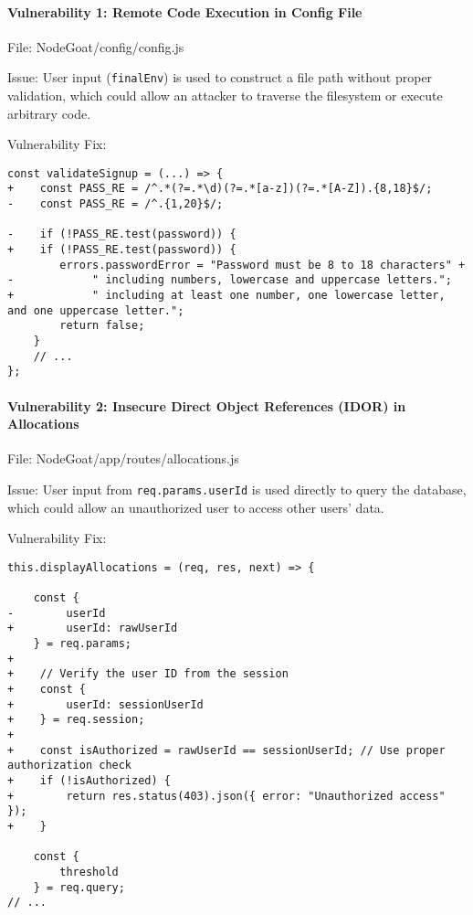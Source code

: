   \hypertarget{vulnerability-1-remote-code-execution-in-config-file}{%
  \paragraph{Vulnerability 1: Remote Code Execution in Config
  File}\label{vulnerability-1-remote-code-execution-in-config-file}}
  
  File: NodeGoat/config/config.js
  
  Issue: User input (\texttt{finalEnv}) is used to construct a file path
  without proper validation, which could allow an attacker to traverse the
  filesystem or execute arbitrary code.
  
  Vulnerability Fix:
  
  \begin{framed}\scriptsize
    \begin{verbatim}
const validateSignup = (...) => {
+    const PASS_RE = /^.*(?=.*\d)(?=.*[a-z])(?=.*[A-Z]).{8,18}$/;
-    const PASS_RE = /^.{1,20}$/;

-    if (!PASS_RE.test(password)) {
+    if (!PASS_RE.test(password)) {
        errors.passwordError = "Password must be 8 to 18 characters" +
-            " including numbers, lowercase and uppercase letters.";
+            " including at least one number, one lowercase letter, and one uppercase letter.";
        return false;
    }
    // ...
};
     \end{verbatim}
     
  \end{framed}\normalsize
  
  \hypertarget{vulnerability-2-insecure-direct-object-references-idor-in-allocations}{%
  \paragraph{Vulnerability 2: Insecure Direct Object References (IDOR) in
  Allocations}\label{vulnerability-2-insecure-direct-object-references-idor-in-allocations}}
  
  File: NodeGoat/app/routes/allocations.js
  
  Issue: User input from \texttt{req.params.userId} is used directly to
  query the database, which could allow an unauthorized user to access
  other users' data.
  
  Vulnerability Fix:
  
  \begin{framed}\scriptsize
    \begin{verbatim}
this.displayAllocations = (req, res, next) => {
    
    const {
-        userId
+        userId: rawUserId
    } = req.params;
+
+    // Verify the user ID from the session
+    const {
+        userId: sessionUserId
+    } = req.session;
+
+    const isAuthorized = rawUserId == sessionUserId; // Use proper authorization check
+    if (!isAuthorized) {
+        return res.status(403).json({ error: "Unauthorized access" });
+    }

    const {
        threshold
    } = req.query;
// ...
      \end{verbatim}
      
  \end{framed}\normalsize
  
